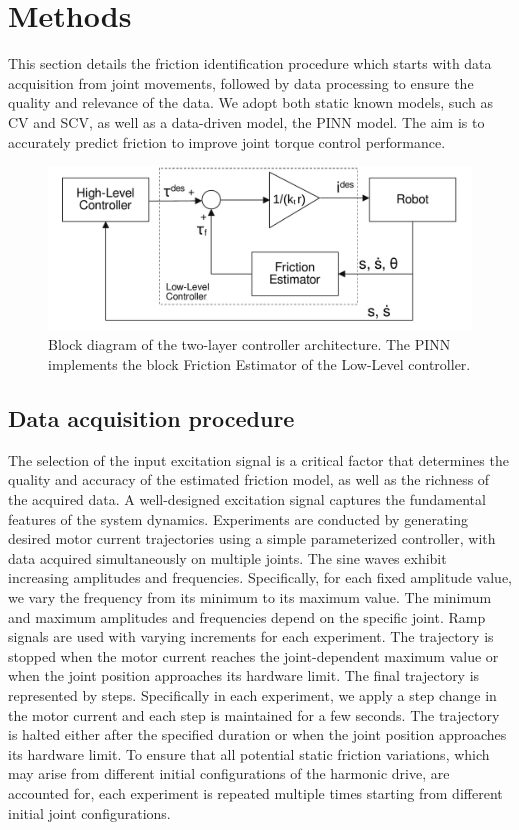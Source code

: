 \section{Methods}
\label{sec:methods}

This section details the friction identification procedure which starts with data acquisition from joint movements, followed by data processing to ensure the quality and relevance of the data. We adopt both static known models, such as CV and SCV, as well as a data-driven model, the PINN model. The aim is to accurately predict friction to improve joint torque control performance.

\begin{figure}[t]
    \centering
    \includegraphics[width=1.0\linewidth]{figures/controlschema.pdf}
    \caption{Block diagram of the two-layer controller architecture. The PINN implements the block Friction Estimator of the Low-Level controller.}
    \label{fig:controlarchitecture}
    \vspace{-20pt}
\end{figure}

\subsection{Data acquisition procedure}
The selection of the input excitation signal is a critical factor that determines the quality and accuracy of the estimated friction model, as well as the richness of the acquired data. A well-designed excitation signal captures the fundamental features of the system dynamics.
Experiments are conducted by generating desired motor current trajectories using a simple parameterized controller, with data acquired simultaneously on multiple joints. The sine waves exhibit increasing amplitudes and frequencies. Specifically, for each fixed amplitude value, we vary the frequency from its minimum to its maximum value. The minimum and maximum amplitudes and frequencies depend on the specific joint. Ramp signals are used with varying increments for each experiment. The trajectory is stopped when the motor current reaches the joint-dependent maximum value or when the joint position approaches its hardware limit. The final trajectory is represented by steps. Specifically in each experiment, we apply a step change in the motor current and each step is maintained for a few seconds. The trajectory is halted either after the specified duration or when the joint position approaches its hardware limit. To ensure that all potential static friction variations, which may arise from different initial configurations of the harmonic drive, are accounted for, each experiment is repeated multiple times starting from different initial joint configurations.

